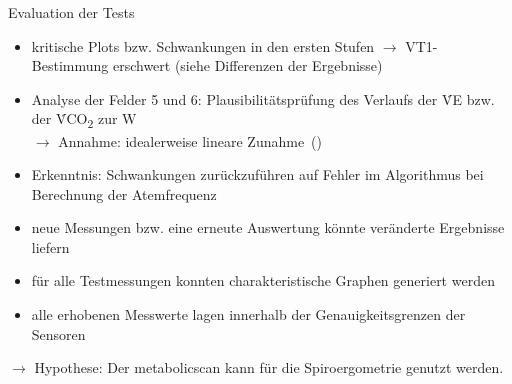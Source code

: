 \documentclass[colorBG,slideColor,8pt]{beamer}
\newcommand{\vcotwo}{\.{V}CO\textsubscript{2}}
\newcommand{\ve}{\.{V}E}
\begin{document}
\begin{frame}{Evaluation der Tests}
\begin{itemize}
	\item kritische Plots bzw. Schwankungen in den ersten Stufen $\rightarrow$ VT1-Bestimmung erschwert (siehe Differenzen der Ergebnisse)
	\item Analyse der Felder 5 und 6: Plausibilitätsprüfung des Verlaufs der \ve{} bzw. der \vcotwo{} zur W\\$\rightarrow$ Annahme: idealerweise lineare Zunahme~(\cite{Ruehle.2012})
	\item Erkenntnis: Schwankungen zurückzuführen auf Fehler im Algorithmus bei Berechnung der Atemfrequenz
	\item neue Messungen bzw. eine erneute Auswertung könnte veränderte Ergebnisse liefern
	\item für alle Testmessungen konnten charakteristische Graphen generiert werden
	\item alle erhobenen Messwerte lagen innerhalb der Genauigkeitsgrenzen der Sensoren
\end{itemize}
\begin{center}
\vspace{3ex}
$\rightarrow$ Hypothese: Der metabolicscan kann für die Spiroergometrie genutzt werden.
\end{center}
\end{frame}
\end{document}
